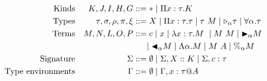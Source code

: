 \begin{align*}
	\textrm{Kinds}             &  & K,J,I,H,G                & ::= * \mid \Pi x:\tau.K                                                           \\
	\textrm{Types}             &  & \tau,\sigma,\rho,\pi,\xi & ::= X \mid \Pi x:\tau.\tau \mid \tau\ M \mid {\mathop{\triangleright}}_{\alpha} \tau \mid \forall\alpha.\tau \\
	\textrm{Terms}             &  & M,N,L,O,P                & ::= c \mid x \mid \lambda x:\tau.M\ \mid M\ M \mid {\mathop{\blacktriangleright}}_\alpha M                   \\
	                           &  &                          & \ \ \ \ \mid {\mathop{\blacktriangleleft}}_\alpha M \mid \Lambda\alpha.M \mid M\ A \mid \%_\alpha M        \\
	\textrm{Signature}         &  & \Sigma                   & ::= \emptyset \mid \Sigma, X::K \mid \Sigma, c:\tau                               \\
	\textrm{Type environments} &  & \Gamma                   & ::= \emptyset \mid  \Gamma,x:\tau @A                                              \\
\end{align*}



